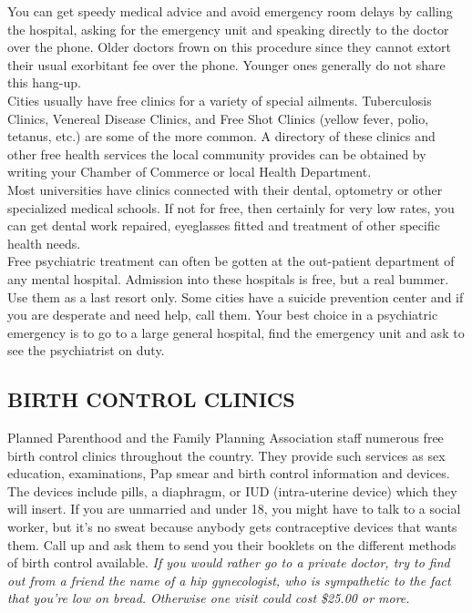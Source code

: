 \documentclass[11pt,twoside,a4paper]{book}
\begin{document}
You can get speedy medical advice and avoid emergency room delays by calling the hospital, asking for the emergency unit and speaking directly to the doctor over the phone. Older doctors frown on this procedure since they cannot extort their usual exorbitant fee over the phone. Younger ones generally do not share this hang-up.~\\

Cities usually have free clinics for a variety of special ailments. Tuberculosis Clinics, Venereal Disease Clinics, and Free Shot Clinics (yellow fever, polio, tetanus, etc.) are some of the more common. A directory of these clinics and other free health services the local community provides can be obtained by writing your Chamber of Commerce or local Health Department.~\\

Most universities have clinics connected with their dental, optometry or other specialized medical schools. If not for free, then certainly for very low rates, you can get dental work repaired, eyeglasses fitted and treatment of other specific health needs.~\\

Free psychiatric treatment can often be gotten at the out-patient department of any mental hospital. Admission into these hospitals is free, but a real bummer. Use them as a last resort only. Some cities have a suicide prevention center and if you are desperate and need help, call them. Your best choice in a psychiatric emergency is to go to a large general hospital, find the emergency unit and ask to see the psychiatrist on duty.

\subsection{BIRTH CONTROL CLINICS}

Planned Parenthood and the Family Planning Association staff numerous free birth control clinics throughout the country. They provide such services as sex education, examinations, Pap smear and birth control information and devices. The devices include pills, a diaphragm, or IUD (intra-uterine device) which they will insert. If you are unmarried and under 18, you might have to talk to a social worker, but it's no sweat because anybody gets contraceptive devices that wants them. Call up and ask them to send you their booklets on the different methods of birth control available. \emph{If you would rather go to a private doctor, try to find out from a friend the name of a hip gynecologist, who is sympathetic to the fact that you're low on bread. Otherwise one visit could cost \$25.00 or more. }~\\
\end{document}
